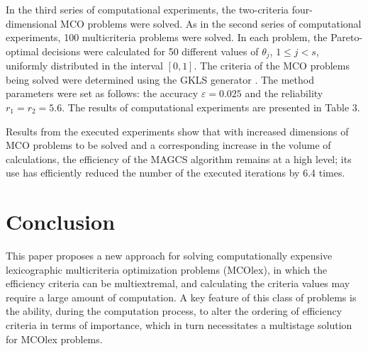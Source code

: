 \documentclass[smallextended]{svjour3}       %
\begin{document}
In the third series of computational experiments, the two-criteria four-dimensional MCO problems were solved. As in the second series of computational experiments, 100 multicriteria problems were solved. In each problem, the Pareto-optimal decisions were calculated for 50 different values of $\theta_j$, $1 \leq j <s$, uniformly distributed in the interval $[0,1]$. The criteria of the MCO problems being solved were determined using the GKLS generator \cite{c37}. The method parameters were set as follows: the accuracy $\varepsilon = 0.025$ and the reliability $r_1=r_2=5.6$. The results of computational experiments are presented in Table 3.


\begin{table}[ht]
\centering
\caption{Results of the series of experiments to solve two-criteria four-dimensional MCO}
\label{tab:3}
\end{table}


Results from the executed experiments show that with increased dimensions of MCO problems to be solved and a corresponding increase in the volume of calculations, the efficiency of the MAGCS algorithm remains at a high level;  its use has efficiently reduced the number of the executed iterations by 6.4 times.



\section{Conclusion}
\label{sec:5}

This paper proposes a new approach for solving computationally expensive lexicographic multicriteria optimization problems (MCOlex), in which the efficiency criteria can be multiextremal, and calculating the criteria values may require a large amount of computation. A key feature of this class of problems is the ability, during the computation process, to alter the ordering of efficiency criteria in terms of importance, which in turn necessitates a multistage solution for MCOlex problems.
\end{document}
